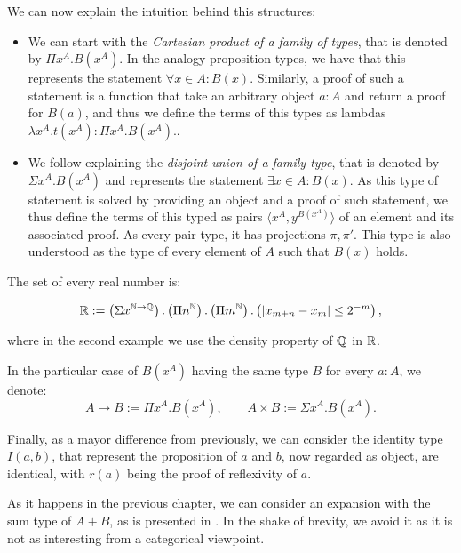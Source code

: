 We can now explain the intuition behind this structures:

\begin{itemize}
\item We can start with the \emph{Cartesian product of a family of types}, that is denoted by $\Pi x^A. B(x^A)$. In the analogy proposition-types, we have that this represents the statement $\forall x \in A : B(x)$. Similarly, a proof of such a statement is a function that take an arbitrary object $a:A$ and return a proof for $B(a)$, and thus we define the terms of this types as lambdas $\lambda x^A.t(x^A) : \Pi x^A. B(x^A).$.\\


\item We follow explaining the \emph{disjoint union of a family type}, that is denoted by $\Sigma x^A. B(x^A)$ and represents the statement $\exists x \in A : B(x)$. As this type of statement is solved by providing an object and a proof of such statement, we thus define the terms of this typed as pairs $\langle x^A, y^{B(x^A)}\rangle$ of an element and its associated proof. As every pair type, it has projections $\pi,\pi'$. This type is also understood as the type of every element of $A$ such that $B(x)$ holds.
\end{itemize}
\begin{example}
  The set of every real number is:

  $$\mathbb{R} := \left(\Sigma x^{\mathbb{N}\to\mathbb{Q}}\right).\left(\Pi n^{\mathbb{N}}\right).\left(\Pi m^{\mathbb{N}}\right).\left(|x_{m+n} - x_m| \le 2^{-m}\right),$$
  
  where in the second example we use the density property of $\mathbb{Q}$ in $\mathbb{R}$.\\
\end{example}

In the particular case of $B(x^A)$ having the same type $B$ for every $a:A$, we denote:
$$A\to B:= \Pi x^A. B(x^A),\qquad A\times B := \Sigma x^A. B(x^A).$$

Finally, as a mayor difference from previously, we can consider the identity type $I(a,b)$, that represent the proposition of $a$ and $b$, now regarded as object, are identical, with $r(a)$ being the proof of reflexivity of $a$. 


\begin{remark}
  As it happens in the previous chapter, we can consider an expansion with the sum type of $A+B$, as is presented in \cite[Section 1.6]{martinlof1973intuitionistic}. In the shake of brevity, we avoid it as it is not as interesting from a categorical viewpoint.
\end{remark}

